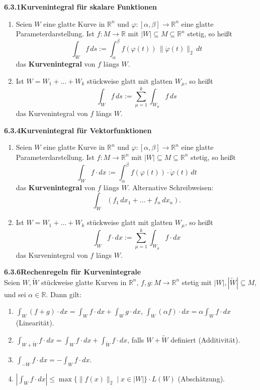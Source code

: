\documentclass[a4paper,12pt]{article}
\newcommand{\gentry}[3]{%
  \noindent\textbf{#1\quad #2}\nopagebreak\\[0.2em]
  #3\par\smallskip
}
\begin{document}
\gentry{6.3.1}{Kurvenintegral für skalare Funktionen}{%
  \begin{enumerate}[label=(\roman*),topsep=2pt,itemsep=2pt]
    \item Seien $W$ eine glatte Kurve in $\mathbb{R}^n$ und
          $\varphi : [\alpha, \beta] \longrightarrow \mathbb{R}^n$ eine glatte
          Parameterdarstellung. Ist $f : M \longrightarrow \mathbb{R}$ mit
          $|W| \subseteq M \subseteq \mathbb{R}^n$ stetig, so heißt
          \[
            \int_W f\, ds := \int_\alpha^\beta f(\varphi(t))\, \|\dot{\varphi}(t)\|_2\, dt
          \]
          das \textbf{Kurvenintegral} von $f$ längs $W$.
    \item Ist $W = W_1 + \ldots + W_k$ stückweise glatt mit glatten $W_\mu$, so heißt
          \[
            \int_W f\, ds := \sum_{\mu=1}^{k} \int_{W_\mu} f\, ds
          \]
          das Kurvenintegral von $f$ längs $W$.
  \end{enumerate}
}

\gentry{6.3.4}{Kurvenintegral für Vektorfunktionen}{%
  \begin{enumerate}[label=(\roman*),topsep=2pt,itemsep=2pt]
    \item Seien $W$ eine glatte Kurve in $\mathbb{R}^n$ und
          $\varphi : [\alpha, \beta] \longrightarrow \mathbb{R}^n$ eine glatte
          Parameterdarstellung. Ist $f : M \longrightarrow \mathbb{R}^n$ mit
          $|W| \subseteq M \subseteq \mathbb{R}^n$ stetig, so heißt
          \[
            \int_W f \cdot dx := \int_\alpha^\beta f(\varphi(t)) \cdot \dot{\varphi}(t)\, dt
          \]
          das \textbf{Kurvenintegral} von $f$ längs $W$. Alternative Schreibweisen:
          \[
            \int_W (f_1\, dx_1 + \ldots + f_n\, dx_n).
          \]
    \item Ist $W = W_1 + \ldots + W_k$ stückweise glatt mit glatten $W_\mu$, so heißt
          \[
            \int_W f \cdot dx := \sum_{\mu=1}^{k} \int_{W_\mu} f \cdot dx
          \]
          das Kurvenintegral von $f$ längs $W$.
  \end{enumerate}
}

\gentry{6.3.6}{Rechenregeln für Kurvenintegrale}{%
  Seien $W, \widetilde{W}$ stückweise glatte Kurven in $\mathbb{R}^n$,
  $f, g : M \longrightarrow \mathbb{R}^n$ stetig mit $|W|, |\widetilde{W}| \subseteq M$,
  und sei $\alpha \in \mathbb{R}$. Dann gilt:
  \begin{enumerate}[label=(\roman*),topsep=2pt,itemsep=1pt]
    \item $\displaystyle \int_W (f+g) \cdot dx = \int_W f \cdot dx + \int_W g \cdot dx$,
          \quad $\displaystyle \int_W (\alpha f) \cdot dx = \alpha \int_W f \cdot dx$
          \hfill (Linearität).
    \item $\displaystyle \int_{W+\widetilde{W}} f \cdot dx = \int_W f \cdot dx + \int_{\widetilde{W}} f \cdot dx$,
          falls $W + \widetilde{W}$ definiert \hfill (Additivität).
    \item $\displaystyle \int_{-W} f \cdot dx = -\int_W f \cdot dx$.
    \item $\displaystyle \left|\int_W f \cdot dx\right| \leq \max\{\|f(x)\|_2 \mid x \in |W|\} \cdot L(W)$
          \hfill (Abschätzung).
  \end{enumerate}
}
\end{document}
